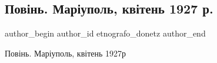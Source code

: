  
 
 
 
 

\subsection{Повінь. Маріуполь, квітень 1927 р.}
\label{sec:01_09_2023.fb.etnografo_donetz.1.povinj_mariupol_kviten_1927}

\ifcmt
 author_begin
   author_id etnografo_donetz
 author_end
\fi

Повінь. Маріуполь, квітень 1927р
